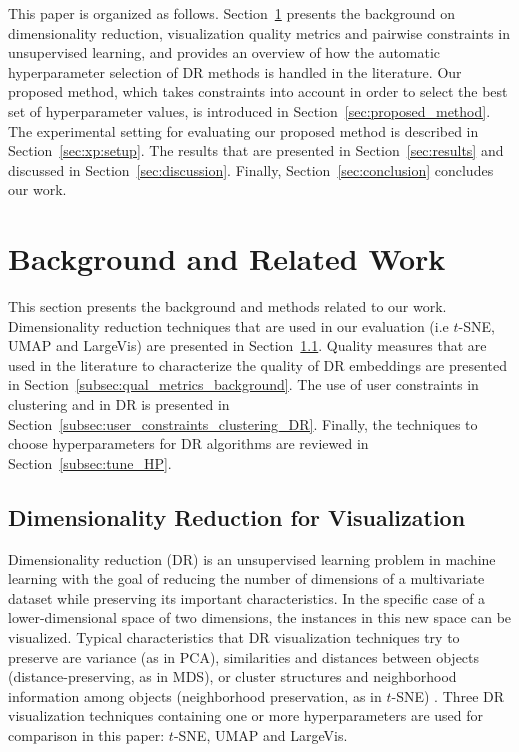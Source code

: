 This paper is organized as follows. Section~\ref{sec:background} presents the background on dimensionality reduction, visualization quality metrics and pairwise constraints in unsupervised learning, and provides an overview of how the automatic hyperparameter selection of DR methods is handled in the literature. Our proposed method, which takes constraints into account in order to select the best set of hyperparameter values, is introduced in Section~\ref{sec:proposed_method}. The experimental setting for evaluating our proposed method is described in Section~\ref{sec:xp:setup}. The results that are presented in Section~\ref{sec:results} and discussed in Section~\ref{sec:discussion}. Finally, Section~\ref{sec:conclusion} concludes our work.

\section{Background and Related Work}\label{sec:background}

This section  presents the background and methods related to our work. Dimensionality reduction techniques that are used in our evaluation (i.e $t$-SNE, UMAP and LargeVis) are presented in Section~\ref{subsec:background_DR}. Quality measures that are used in the literature to characterize the quality of DR embeddings are presented in Section~\ref{subsec:qual_metrics_background}. The use of user constraints in clustering and in DR is presented in Section~\ref{subsec:user_constraints_clustering_DR}. Finally, the techniques to choose hyperparameters for DR algorithms are reviewed in Section~\ref{subsec:tune_HP}.%

\subsection{Dimensionality Reduction for Visualization}\label{subsec:background_DR}

Dimensionality reduction (DR) is an unsupervised learning problem in machine learning with the goal of reducing the number of dimensions of a multivariate dataset while preserving its important characteristics. In the specific case of a lower-dimensional space of two dimensions, the instances in this new space can be visualized. Typical characteristics that DR visualization techniques try to preserve are variance (as in PCA), similarities and distances between objects (distance-preserving, as in MDS), or cluster structures and neighborhood information among objects (neighborhood preservation, as in $t$-SNE) \cite{lee2007}. Three DR visualization techniques containing one or more hyperparameters are used for comparison in this paper: $t$-SNE, UMAP and LargeVis.

